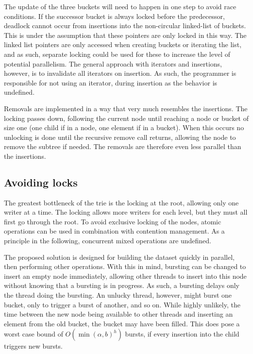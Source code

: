 The update of the three buckets will need to happen in one
step to avoid race conditions. If the successor bucket is always locked before
the predecessor, deadlock cannot occur from insertions into the non-circular
linked-list of buckets. This is under the assumption that these pointers are
only locked in this way. The linked list pointers are only accessed when
creating buckets or iterating the list, and as such, separate locking could be
used for these to increase the level of potential parallelism. The general
approach with iterators and insertions, however, is to invalidate all iterators
on insertion. As such, the programmer is responsible for not using an iterator,
during insertion as the behavior is undefined.

Removals are implemented in a way that very much resembles the insertions. The
locking passes down, following the current node until reaching a node or bucket
of size one (one child if in a node, one element if in a bucket). When this
occurs no unlocking is done until the recursive remove call returns, allowing
the node to remove the subtree if needed. The removals are therefore even less
parallel than the insertions.

\subsection{Avoiding locks}
The greatest bottleneck of the trie is the locking at the root, allowing only
one writer at a time. The locking allows more writers for each level, but they
must all first go through the root. To avoid exclusive locking of the nodes,
atomic operations can be used in combination with contention management.
As a principle in the following, concurrent mixed operations are undefined.

The proposed solution is designed for building the dataset quickly in
parallel, then performing other operations. With this in mind, bursting can be
changed to insert an empty node immediately, allowing other threads to insert
into this node without knowing that a bursting is in progress. As such, a
bursting delays only the thread doing the bursting. An unlucky thread, however,
might burst one bucket, only to trigger a burst of another, and so on. While
highly unlikely, the time between the new node being available to other threads
and inserting an element from the old bucket, the bucket may have been filled.
This does pose a worst case bound of $O(\min(\alpha, b)^h)$ bursts, if every insertion
into the child triggers new bursts.

